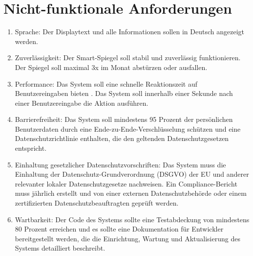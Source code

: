 \documentclass{article}
\begin{document}
\section{Nicht-funktionale Anforderungen}
\begin{enumerate}[label=\textbf{NFA\arabic*:}]
    \item Sprache: Der Displaytext und alle Informationen sollen in Deutsch angezeigt werden.
    \item Zuverlässigkeit: Der Smart-Spiegel soll stabil und zuverlässig funktionieren. Der Spiegel soll maximal 3x im Monat abstürzen oder ausfallen.
    \item Performance: Das System soll eine schnelle Reaktionszeit auf Benutzereingaben bieten . Das System soll innerhalb einer Sekunde nach einer Benutzereingabe die Aktion ausführen.
    \item Barrierefreiheit: Das System soll mindestens 95 Prozent der persönlichen Benutzerdaten durch eine Ende-zu-Ende-Verschlüsselung schützen und eine Datenschutzrichtlinie enthalten, die den geltenden Datenschutzgesetzen entspricht.
    \item Einhaltung gesetzlicher Datenschutzvorschriften: Das System muss die Einhaltung der Datenschutz-Grundverordnung (DSGVO) der EU und anderer relevanter lokaler Datenschutzgesetze nachweisen. Ein Compliance-Bericht muss jährlich erstellt und von einer externen Datenschutzbehörde oder einem zertifizierten Datenschutzbeauftragten geprüft werden.
    \item Wartbarkeit: Der Code des Systems sollte eine Testabdeckung von mindestens 80 Prozent erreichen und es sollte eine Dokumentation für Entwickler bereitgestellt werden, die die Einrichtung, Wartung und Aktualisierung des Systems detailliert beschreibt.
\end{enumerate}
\end{document}
